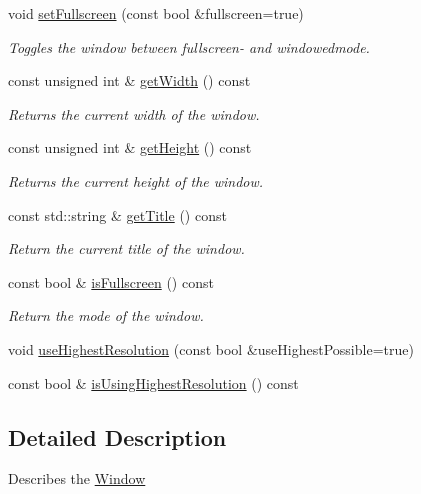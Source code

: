 \begin{DoxyCompactItemize}
void \hyperlink{classburn_1_1_window_settings_a40cbbd8c1fe6303176f947c75a49368a}{set\-Fullscreen} (const bool \&fullscreen=true)
\begin{DoxyCompactList}\small\item\em Toggles the window between fullscreen-\/ and windowedmode. \end{DoxyCompactList}\item 
const unsigned int \& \hyperlink{classburn_1_1_window_settings_ad0344b9a6034f638da74dcd59ecc1857}{get\-Width} () const 
\begin{DoxyCompactList}\small\item\em Returns the current width of the window. \end{DoxyCompactList}\item 
const unsigned int \& \hyperlink{classburn_1_1_window_settings_a6810db1f8ad2193d0d2fe17824bd1d69}{get\-Height} () const 
\begin{DoxyCompactList}\small\item\em Returns the current height of the window. \end{DoxyCompactList}\item 
const std\-::string \& \hyperlink{classburn_1_1_window_settings_ab9eba39bec51f28ee5346efd7b519e9d}{get\-Title} () const 
\begin{DoxyCompactList}\small\item\em Return the current title of the window. \end{DoxyCompactList}\item 
const bool \& \hyperlink{classburn_1_1_window_settings_a686d78169e2525d114d1ee63a351fa68}{is\-Fullscreen} () const 
\begin{DoxyCompactList}\small\item\em Return the mode of the window. \end{DoxyCompactList}\item 
void \hyperlink{classburn_1_1_window_settings_acbd11f1f91c6ac0101bfd4d0bb200017}{use\-Highest\-Resolution} (const bool \&use\-Highest\-Possible=true)
\item 
const bool \& \hyperlink{classburn_1_1_window_settings_aafbf903453121e85de9a34df3eb7c7a1}{is\-Using\-Highest\-Resolution} () const 
\end{DoxyCompactItemize}


\subsection{Detailed Description}
Describes the \hyperlink{classburn_1_1_window}{Window} 

